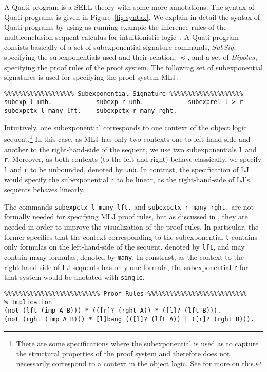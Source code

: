 \documentclass{llncs}
\begin{document}
A Quati program is a SELL theory with some more annotations. The syntax of Quati programs is given in Figure~\ref{fig:syntax}. 
We explain in detail the syntax of Quati programs 
by using as running example the inference rules of the multiconclusion sequent calculus for intuitionistic logic~\cite{maehara}.
A Quati program consists basically of a set of subexponential signature commands, $SubSig$, specifying the subexponentials 
used and their relation, $\preceq$, and a set of $Bipoles$, specifying the proof rules of the proof system. The following set of subexponential 
signatures is used for specifying the proof system MLJ:

\begin{verbatim}
%%%%%%%%%%%%%%%%%%% Subexponential Signature %%%%%%%%%%%%%%%%%%%%
subexp l unb.            subexp r unb.            subexprel l > r
subexpctx l many lft.    subexpctx r many rght.
\end{verbatim}

Intuitively, one subexponential corresponds to one context of the object logic sequent.\footnote{There are 
some specifications where the subexponential is used as to capture the structural properties of the proof 
system and therefore does not necessarily correspond to a context in the object logic. See \cite{nigam.jlc}
for more on this.}
In this case, as MLJ has only two
contexts one to left-hand-side and another to the right-hand-side of the sequent, we use two subexponentials
\texttt{l} and \texttt{r}. Moreover, as both contexts (to the left and right) behave classically, 
we specify \texttt{l} and \texttt{r} to be unbounded, denoted by \texttt{unb}. In contrast, 
the specification of LJ would specify the subexponential \texttt{r} to be linear, as the right-hand-side of LJ's 
sequents behaves linearly.

The commands \texttt{subexpctx l many lft.} and  \texttt{subexpctx r many rght.} are not formally needed for specifying MLJ proof rules, 
but as discussed 
in \cite{nigam14ebl}, they are needed in order to improve the visualization of the proof rules. 
In particular, the former specifies that the context corresponding to the subexponential \texttt{l} contains 
only formulas on the left-hand-side of the sequent, denoted by \texttt{lft}, and may contain many formulas, denoted 
by \texttt{many}. In constrast, as the context to the right-hand-side of LJ sequents has only one formula, the 
subexponential \texttt{r} for that system would be anotated with \texttt{single}.
\begin{verbatim}
%%%%%%%%%%%%%%%%%%%%%%%%%% Proof Rules %%%%%%%%%%%%%%%%%%%%%%%%%%%
% Implication
(not (lft (imp A B))) * (([r]? (rght A)) * ([l]? (lft B))).
(not (rght (imp A B))) * [l]bang (([l]? (lft A)) | ([r]? (rght B))).
\end{verbatim}
\end{document}
